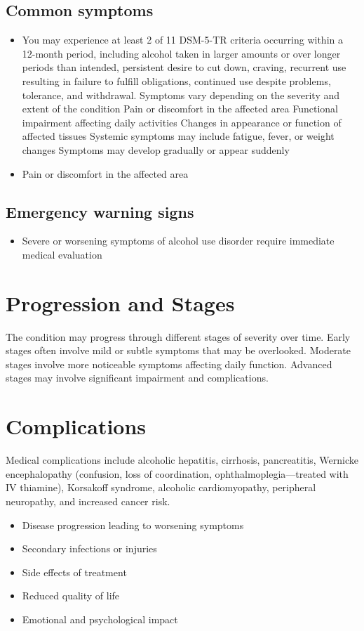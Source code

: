 \subsection{Common symptoms}
\begin{itemize}[noitemsep]
  \item You may experience at least 2 of 11 DSM-5-TR criteria occurring within a 12-month period, including alcohol taken in larger amounts or over longer periods than intended, persistent desire to cut down, craving, recurrent use resulting in failure to fulfill obligations, continued use despite problems, tolerance, and withdrawal. Symptoms vary depending on the severity and extent of the condition Pain or discomfort in the affected area Functional impairment affecting daily activities Changes in appearance or function of affected tissues Systemic symptoms may include fatigue, fever, or weight changes Symptoms may develop gradually or appear suddenly
  \item Pain or discomfort in the affected area
  \end{itemize}

\subsection{Emergency warning signs}
\begin{itemize}[noitemsep]
  \item Severe or worsening symptoms of alcohol use disorder require immediate medical evaluation
\end{itemize}
\section{Progression and Stages}
The condition may progress through different stages of severity over time. Early stages often involve mild or subtle symptoms that may be overlooked. Moderate stages involve more noticeable symptoms affecting daily function. Advanced stages may involve significant impairment and complications.
\section{Complications}
Medical complications include alcoholic hepatitis, cirrhosis, pancreatitis, Wernicke encephalopathy (confusion, loss of coordination, ophthalmoplegia---treated with IV thiamine), Korsakoff syndrome, alcoholic cardiomyopathy, peripheral neuropathy, and increased cancer risk.

\begin{itemize}[noitemsep]
  \item Disease progression leading to worsening symptoms
  \item Secondary infections or injuries
  \item Side effects of treatment
  \item Reduced quality of life
  \item Emotional and psychological impact
\end{itemize}
